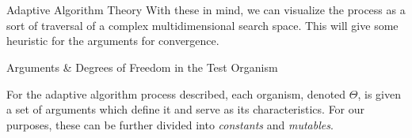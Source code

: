 \documentclass[12pt]{beamer}
\renewcommand{\maketitle}{%
	\begin{center}%
		\Huge\inserttitle\\[5mm]%
		\Large\insertauthor\\[5mm]%
		\Large\insertinstitute%
	\end{center}%
	\vspace*{-1ex}%
}
\begin{document}
\begin{frame}{\maketitle}
\begin{columns}
\begin{column}{.45\textwidth}
\begin{exampleblock}{Adaptive Algorithm Theory}
	With these in mind, we can visualize the process as a sort of traversal of a complex multidimensional search space. This will give some heuristic for the arguments for convergence.

%
%
%
%
%
%
%
%
%
%
\end{exampleblock}
\begin{exampleblock}{Arguments \& Degrees of Freedom in the Test Organism}


	For the adaptive algorithm process described, each organism, denoted $\Theta$, is given a set of arguments which define it and serve as its characteristics. For our purposes, these can be further divided into \emph{constants} and \emph{mutables}. 


\end{exampleblock}
\end{column}
\end{columns}
\end{frame}
\end{document}
